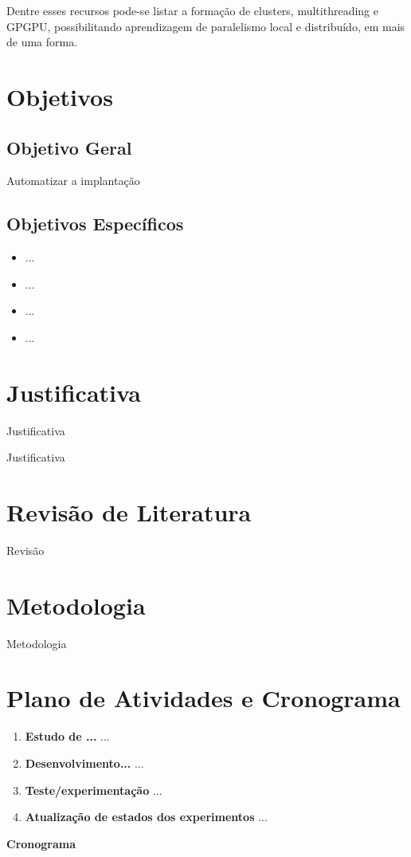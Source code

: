\documentclass[12pt]{article}
\begin{document}
Dentre esses recursos pode-se listar a formação de clusters, multithreading e GPGPU, possibilitando aprendizagem de paralelismo local e distribuído, em mais de uma forma.


\section{Objetivos}
\subsection{Objetivo Geral}
Automatizar a implantação 

\subsection{Objetivos Específicos}
\begin{itemize}
	\item ...
	\item ...
	\item ...
	\item ...
    
\end{itemize}

\section{Justificativa}
Justificativa

Justificativa

\section{Revisão de Literatura}

Revisão

\section{Metodologia}
Metodologia

\section{Plano de Atividades e Cronograma}
\begin{enumerate}
\item \label{activity:cloud} \textbf{Estudo de ...}
...
\item \label{activity:develop} \textbf{Desenvolvimento...}
...
\item \label{activity:exec} \textbf{Teste/experimentação}
...
\item  \label{activity:updates} \textbf{Atualização de estados dos experimentos}
...
\end{enumerate}
\textbf{Cronograma}
\end{document}
